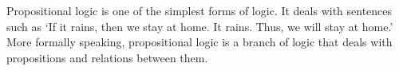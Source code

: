  \label{sec:plogic}

Propositional logic is one of the simplest forms of logic.
It deals with sentences such as
`If it rains, then we stay at home.
It rains.
Thus, we will stay at home.'
More formally speaking,
propositional logic is a branch of logic that deals with
propositions
and relations between them.